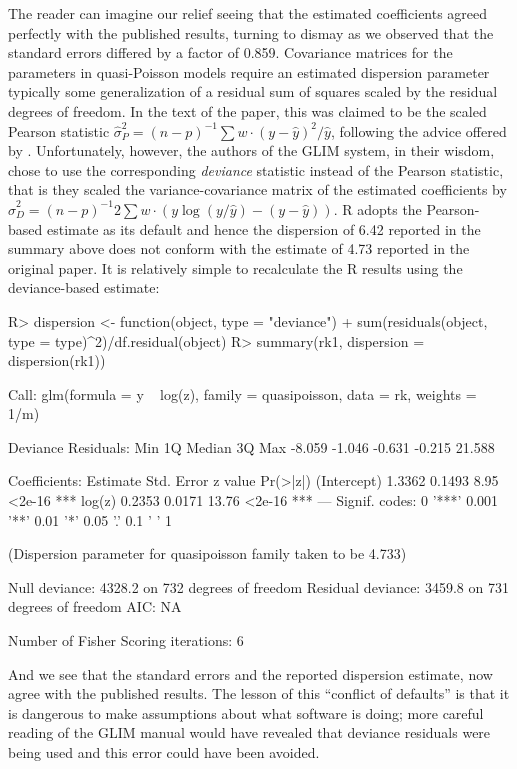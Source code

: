 \documentclass[10pt,a4paper,twoside]{article}
\let\proglang=\textsf
\newenvironment{Schunk}{}{}
\begin{document}
The reader can imagine our relief seeing that the estimated coefficients
agreed perfectly with the published results, turning to dismay as we observed
that the standard errors differed by a factor of 
0.859.  
Covariance matrices for the parameters in quasi-Poisson models require 
an estimated dispersion parameter 
typically some generalization of a residual sum of squares scaled by the
residual degrees of freedom. In the text of the paper, this was claimed
to be the scaled Pearson statistic
$\hat \sigma_P^2 = (n-p)^{-1} \sum w \cdot (y - \hat y)^2 / \hat y$,
following the advice offered by \citet[pp.~172--173]{repro:McCullagh+Nelder:1983}.
Unfortunately, however, the authors of the \proglang{GLIM} system, in their wisdom,  
chose to use the corresponding \emph{deviance} statistic instead of the 
Pearson statistic, that is
they scaled the variance-covariance matrix of the estimated coefficients by
$\hat \sigma_D^2 = (n-p)^{-1} 2 \sum w \cdot (y \log(y/\hat y) - (y - \hat y))$.
\proglang{R} adopts the Pearson-based estimate as its default and hence the
dispersion of 6.42
reported in the summary above does not conform with the estimate of
4.73 reported in the 
original paper.  It is relatively simple to recalculate the \proglang{R} 
results using the deviance-based estimate:
\begin{Schunk}
\begin{Sinput}
R> dispersion <- function(object, type = "deviance")
+    sum(residuals(object, type = type)^2)/df.residual(object)
R> summary(rk1, dispersion = dispersion(rk1))
\end{Sinput}
\begin{Soutput}
Call:
glm(formula = y ~ log(z), family = quasipoisson, data = rk, weights = 1/m)

Deviance Residuals: 
   Min      1Q  Median      3Q     Max  
-8.059  -1.046  -0.631  -0.215  21.588  

Coefficients:
            Estimate Std. Error z value Pr(>|z|)    
(Intercept)   1.3362     0.1493    8.95   <2e-16 ***
log(z)        0.2353     0.0171   13.76   <2e-16 ***
---
Signif. codes:  0 '***' 0.001 '**' 0.01 '*' 0.05 '.' 0.1 ' ' 1 

(Dispersion parameter for quasipoisson family taken to be 4.733)

    Null deviance: 4328.2  on 732  degrees of freedom
Residual deviance: 3459.8  on 731  degrees of freedom
AIC: NA

Number of Fisher Scoring iterations: 6
\end{Soutput}
\end{Schunk}
And we see that the standard errors and the reported dispersion estimate,
now agree with the published results.  The lesson
of this ``conflict of defaults'' is that it is dangerous  to make assumptions about
what software is doing; more careful reading of the \proglang{GLIM} manual would have
revealed that deviance residuals were being used and this error could have been
avoided.
\end{document}
